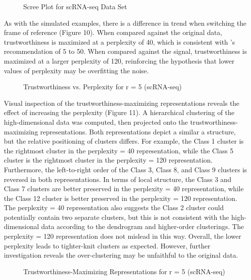 \documentclass{article}
\begin{document}
\renewcommand{\thefigure}{9}
\begin{figure}[H]
\centering
\caption{Scree Plot for scRNA-seq Data Set}
\end{figure}

As with the simulated examples, there is a difference in trend when switching the frame of reference (Figure 10). When compared against the original data, trustworthiness is maximized at a perplexity of 40, which is consistent with \cite{t-SNE}'s recommendation of 5 to 50. When compared against the signal, trustworthiness is maximized at a larger perplexity of 120, reinforcing the hypothesis that lower values of perplexity may be overfitting the noise.

\renewcommand{\thefigure}{10}
\begin{figure}[H]
\centering
\caption{Trustworthiness vs. Perplexity for r = 5 (scRNA-seq)}
\end{figure}

Visual inspection of the trustworthiness-maximizing representations reveals the effect of increasing the perplexity (Figure 11). A hierarchical clustering of the high-dimensional data was computed, then projected onto the trustworthiness-maximizing representations. Both representations depict a similar a structure, but the relative positioning of clusters differs. For example, the Class 1 cluster is the rightmost cluster in the perplexity = 40 representation, while the Class 5 cluster is the rightmost cluster in the perplexity = 120 representation. Furthermore, the left-to-right order of the Class 3, Class 8, and Class 9 clusters is reversed in both representations. In terms of local structure, the Class 3 and Class 7 clusters are better preserved in the perplexity = 40 representation, while the Class 12 cluster is better preserved in the perplexity = 120 representation. The perplexity = 40 representation also suggests the Class 2 cluster could potentially contain two separate clusters, but this is not consistent with the high-dimensional data according to the dendrogram and higher-order clusterings. The perplexity = 120 representation does not mislead in this way. Overall, the lower perplexity leads to tighter-knit clusters as expected. However, further investigation reveals the over-clustering may be unfaithful to the original data.

\renewcommand{\thefigure}{11}
\begin{figure}[H]
\centering
\caption{Trustworthiness-Maximizing Representations for r = 5 (scRNA-seq)}
\end{figure}
\end{document}
